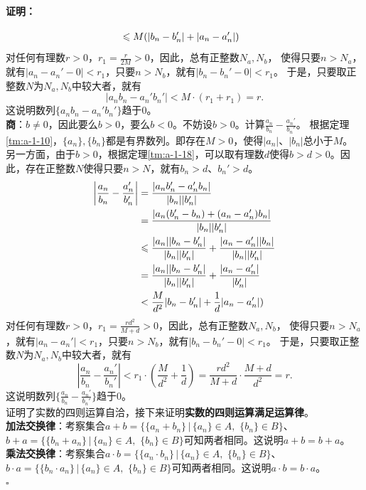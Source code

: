 \documentclass[12pt,UTF8]{ctexbook}
\newenvironment{proof2}{\paragraph{\textbf{证明：}}}{\hfill$\square$}
\begin{document}
\begin{appendix}
\begin{proof2}
\begin{align}
        &\leqslant M(|b_n - b_n'| + |a_n - a_n'|) \notag 
    \end{align}
    对任何有理数$r>0$，$r_1 = \frac{r}{2M}>0$，因此，总有正整数$N_a,N_b$，
    使得只要$n>N_a$，就有$|a_n - a_n' - 0| < r_1$，只要$n>N_b$，就有$|b_n - b_n' - 0| < r_1$。
    于是，只要取正整数$N$为$N_a,N_b$中较大者，就有
    $$ |a_nb_n - a_n'b_n'| < M\cdot \left(r_1 + r_1\right) = r.$$
    这说明数列$\{a_nb_n - a_n'b_n'\}$趋于$0$。\\
    \textbf{商}：$b\neq 0$，因此要么$b>0$，要么$b<0$。不妨设$b>0$。计算$\frac{a_n}{b_n} - \frac{a_n'}{b_n'}$。
    根据定理\ref{tm:a-1-10}，$\{a_n\}, \{b_n\}$都是有界数列。即存在$M>0$，使得$|a_n|$、$|b_n|$总小于$M$。
    另一方面，由于$b>0$，根据定理\ref{tm:a-1-18}，可以取有理数$d$使得$b>d>0$。因此，存在正整数$N$使得只要$n>N$，就有$b_n>d$、$b_n'>d$。
    \begin{align}
        \left|\frac{a_n}{b_n} - \frac{a_n'}{b_n'}\right| &= \frac{|a_nb_n' - a_n'b_n|}{|b_n||b_n'|} \notag \\
        &= \frac{|a_n(b_n' - b_n) + (a_n - a_n')b_n|}{|b_n||b_n'|} \notag \\
        &\leqslant \frac{|a_n||b_n - b_n'|}{|b_n||b_n'|} + \frac{|a_n - a_n'||b_n|}{|b_n||b_n'|} \notag \\
        &= \frac{|a_n||b_n - b_n'|}{|b_n||b_n'|} + \frac{|a_n - a_n'|}{|b_n'|} \notag \\
        &< \frac{M}{d^2}|b_n - b_n'| + \frac{1}{d}|a_n - a_n'|) \notag 
    \end{align}
    对任何有理数$r>0$，$r_1 = \frac{rd^2}{M+d}>0$，因此，总有正整数$N_a,N_b$，
    使得只要$n>N_a$，就有$|a_n - a_n'| < r_1$，只要$n>N_b$，就有$|b_n - b_n' - 0| < r_1$。
    于是，只要取正整数$N$为$N_a,N_b$中较大者，就有
    $$ \left|\frac{a_n}{b_n} - \frac{a_n'}{b_n'}\right| < r_1\cdot \left(\frac{M}{d^2} + \frac{1}{d}\right) = \frac{rd^2}{M+d}\cdot \frac{M+d}{d^2} = r.$$
    这说明数列$\{\frac{a_n}{b_n} - \frac{a_n'}{b_n'}\}$趋于$0$。\\
    证明了实数的四则运算自洽，接下来证明\textbf{实数的四则运算满足运算律}。\\
    \textbf{加法交换律}：考察集合$a + b = \{\{a_n + b_n\} \, |\, \{a_n\}\in A,\,\,\{b_n\}\in B \}$、
    $b + a = \{\{b_n + a_n\} \, |\, \{a_n\}\in A,\,\,\{b_n\}\in B \}$可知两者相同。这说明$a + b = b + a$。\\
    \textbf{乘法交换律}：考察集合$a\cdot b = \{\{a_n \cdot b_n\} \, |\, \{a_n\}\in A,\,\,\{b_n\}\in B \}$、
    $b\cdot a = \{\{b_n \cdot a_n\} \, |\, \{a_n\}\in A,\,\,\{b_n\}\in B \}$可知两者相同。这说明$a \cdot b = b \cdot a$。\\

\end{proof2}
\end{appendix}
\end{document}
